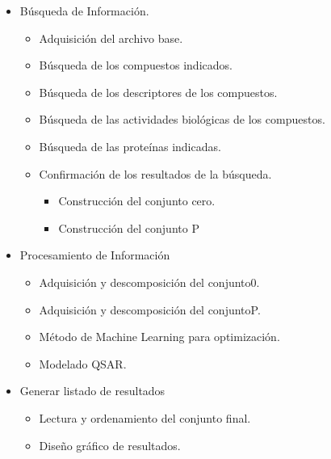 {\begin{itemize}
    \item Búsqueda de Información.
    \begin{itemize}
        \item Adquisición del archivo base.
        \item Búsqueda de los compuestos indicados.
        \item Búsqueda de los descriptores de los compuestos.
        \item Búsqueda de las actividades biológicas de los compuestos.
        \item Búsqueda de las proteínas indicadas.
        \item Confirmación de los resultados de la búsqueda.
        \begin{itemize}
            \item Construcción del conjunto cero.
            \item Construcción del conjunto P
        \end{itemize}
    \end{itemize}
    \item Procesamiento de Información
    \begin{itemize}
        \item Adquisición y descomposición del conjunto0.
        \item Adquisición y descomposición del conjuntoP.
        \item Método de Machine Learning para optimización.
        \item Modelado QSAR.
    \end{itemize}
    \item Generar listado de resultados
    \begin{itemize}
        \item Lectura y ordenamiento del conjunto final.
        \item Diseño gráfico de resultados.
    \end{itemize}
\end{itemize}








}